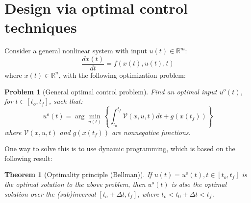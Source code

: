 \documentclass{book}
\newcommand{\argmin}{\arg\!\min}
\newtheorem{theorem}{Theorem}
\newtheorem{problem}{Problem}
\begin{document}
\section{Design via optimal control techniques}
Consider a general nonlinear system with input $ u (t) \in \mathbb{R}^{ m }  $:
\begin{equation}
\frac{dx (t)}{dt} = f (x (t), u (t), t)
\end{equation}
where $ x (t) \in \mathbb{R}^{ n }  $,
with the following optimization problem:
\begin{problem}[General optimal control problem]
		Find an optimal input $ u^{ o } (t)$, for $ t \in \left[ t_{ o }, t_{ f } \right]   $,
		such that:
		\begin{equation}
		u^{ o } (t) = \argmin_{u (t)} \left\{ 
\int_{t_{ 0 }}^{t_{ f }} \mathcal{V} (x,u,t) dt + g (x (t_{ f }))
		\right\} 
		\end{equation}
		where $ \mathcal{V} (x,u,t)  $
		and $ g (x (t_{ f }))  $ are nonnegative functions.
\end{problem}
One way to solve this is to use dynamic programming, which is based on the following result:
\begin{theorem}[Optimality principle (Bellman)]
	If $ u (t) = u^{ o } (t), t \in \left[ t_{ o }, t_{ f } \right]   $	
	is the optimal solution to the above problem, then 
	$ u^{ o } (t)  $ is also the optimal solution over the
	(sub)inverval $ \left[ t_{ o } + \Delta t, t_{ f } \right]   $,
	where $ t_{ o } < t_{ 0 } + \Delta t < t_{ f }  $.
\end{theorem}
\end{document}
